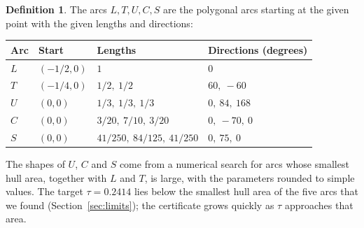 \documentclass[11pt]{amsart}
\theoremstyle{definition}
\newtheorem{definition}[theorem]{Definition}
\theoremstyle{remark}
\numberwithin{equation}{section}
\newcommand{\TAU}{0.2414}
\begin{document}
\begin{definition}\label{def:arcs}
The arcs $L,T,U,C,S$ are the polygonal arcs starting at the given point with the given lengths and directions:
\begin{center}
\begin{tabular}{@{}llll@{}}
\toprule
Arc & Start & Lengths & Directions (degrees)\\
\midrule
$L$ & $(-1/2,0)$ & $1$ & $0$\\
$T$ & $(-1/4,0)$ & $1/2,\ 1/2$ & $60,\ -60$\\
$U$ & $(0,0)$ & $1/3,\ 1/3,\ 1/3$ & $0,\ 84,\ 168$\\
$C$ & $(0,0)$ & $3/20,\ 7/10,\ 3/20$ & $0,\ -70,\ 0$\\
$S$ & $(0,0)$ & $41/250,\ 84/125,\ 41/250$ & $0,\ 75,\ 0$\\
\bottomrule
\end{tabular}
\end{center}
\end{definition}

The shapes of $U$, $C$ and $S$ come from a numerical search for arcs whose smallest hull area, together with $L$ and $T$, is large, with the parameters rounded to simple values. The target $\tau=\TAU$ lies below the smallest hull area of the five arcs that we found (Section~\ref{sec:limits}); the certificate grows quickly as $\tau$ approaches that area.
\end{document}
